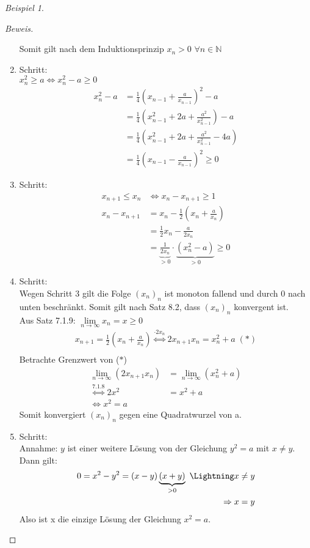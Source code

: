 \documentclass[12pt,a4paper,titlepage]{article} %
\theoremstyle{definition}
\theoremstyle{remark}
\newtheorem*{bsp}{Beispiel}
\newenvironment{bew}{\begin{proof}[Beweis]}{\end{proof}}
\newcommand{\N}{\mathbb{N}}
\newcommand{\limes}[1]{\lim\limits_{#1\rightarrow\infty}}
\begin{document}
\begin{bsp}
\begin{bew}
\begin{enumerate}
					Somit gilt nach dem Induktionsprinzip \(x_n > 0\) \(\forall n \in \N\)
				\item Schritt:\\
					\(x_n^2 \geq a \Leftrightarrow x_n^2 - a \geq 0 \)
					\begin{align*}
						x_n^2 - a &= \frac{1}{4}\left(x_{n-1} + \frac{a}{x_{n-1}}\right)^2 - a\\
						&= \frac{1}{4}\left(x_{n-1}^2 + 2a + \frac{a^2}{x_{n-1}^2}\right) - a\\
						&= \frac{1}{4}\left(x_{n-1}^2 + 2a + \frac{a^2}{x_{n-1}^2} - 4a\right)\\
						&= \frac{1}{4}\left(x_{n-1} - \frac{a}{x_{n-1}}\right)^2 \geq 0
					\end{align*}
				\item Schritt:\\
					\begin{align*}
						x_{n+1} \leq x_n &\Leftrightarrow x_n - x_{n+1} \geq 1\\
						x_n - x_{n+1} &= x_n - \frac{1}{2}(x_n + \frac{a}{x_n})\\
						&=\frac{1}{2}x_n - \frac{a}{2x_n}\\
						&= \underbrace{\frac{1}{2x_n}}_{>0} \cdot \underbrace{(x_n^2 - a)}_{>0} \geq 0
					\end{align*}
				\item Schritt:\\
					Wegen Schritt 3 gilt die Folge \((x_n)_n\) ist monoton fallend und durch 0 nach unten beschränkt. Somit gilt nach Satz 8.2, dass \((x_n)_n\) konvergent ist.\\
					Aus Satz 7.1.9:
					\(\limes{n} x_n = x \geq 0\)
					\begin{align*}
						x_{n+1} = \frac{1}{2}(x_n + \frac{a}{x_n}) \overset{\cdot 2x_n} {\Leftrightarrow} 2x_{n+1}x_n = x_n^2 + a \;(\ast)\\						
					\end{align*}
					Betrachte Grenzwert von (\(\ast\))
					\begin{align*}
						\limes{n} (2x_{n+1}x_n) &= \limes{n} (x_n^2 + a)\\
						\overset{\text{7.1.8}}{\Leftrightarrow} 2x^2 &= x^2 + a\\
						\Leftrightarrow x^2 = a						
					\end{align*}
					Somit konvergiert \((x_n)_n\) gegen eine Quadratwurzel von a.
				\item Schritt:\\
					Annahme: \(y\) ist einer weitere Lösung von der Gleichung \(y^2 = a\) mit \(x \neq y\).\\
					Dann gilt:
					\begin{align*}
						0 = x^2 - y^2 = (x-y)\underbrace{(x+y)}_{>0} \text{ \Lightning} x \neq y\\
						\Rightarrow x = y
					\end{align*}
					Also ist x die einzige Lösung der Gleichung \(x^2 = a\).
			\end{enumerate}
		\end{bew}

\end{bsp}
\end{document}
